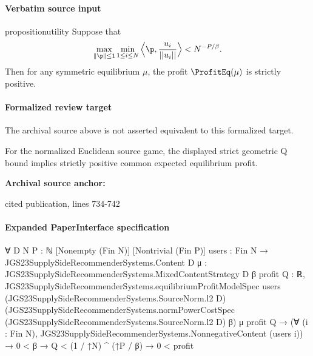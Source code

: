 \documentclass[10pt]{article}
\begin{document}
\paragraph{Verbatim source input}
\begin{ReviewVerbatim}
\begin{restatable}{proposition}{utility}
\label{thm:utility}
Suppose that
\begin{equation}
\label{eq:positiveprofit}
\max_{\|\p\| \le 1} \min_{1 \le i \le N} \Big\langle \p, \frac{u_i}{||u_i||}\Big\rangle < N^{-P/\beta}.
\end{equation}
Then for any symmetric equilibrium $\mu$, the profit $\ProfitEq(\mu)$ is strictly positive.
\end{restatable}
\end{ReviewVerbatim}


\paragraph{Formalized review target}
The archival source above is not asserted equivalent to this formalized target.
\begin{ReviewVerbatim}
For the normalized Euclidean source game, the displayed strict geometric Q bound implies strictly positive common expected equilibrium profit.
\end{ReviewVerbatim}

\textbf{Archival source anchor:} {\footnotesize\raggedright cited publication, lines 734-\allowbreak{}742\par}
\paragraph{Expanded PaperInterface specification}
\begin{ReviewVerbatim}
∀ {D N P : ℕ} [Nonempty (Fin N)] [Nontrivial (Fin P)] {users : Fin N → JGS23SupplySideRecommenderSystems.Content D}
  {μ : JGS23SupplySideRecommenderSystems.MixedContentStrategy D} {β profit Q : ℝ},
  JGS23SupplySideRecommenderSystems.equilibriumProfitModelSpec users (JGS23SupplySideRecommenderSystems.SourceNorm.l2 D)
      (JGS23SupplySideRecommenderSystems.normPowerCostSpec (JGS23SupplySideRecommenderSystems.SourceNorm.l2 D) β) μ
      profit Q →
    (∀ (i : Fin N), JGS23SupplySideRecommenderSystems.NonnegativeContent (users i)) →
      0 < β → Q < (1 / ↑N) ^ (↑P / β) → 0 < profit
\end{ReviewVerbatim}
\end{document}
